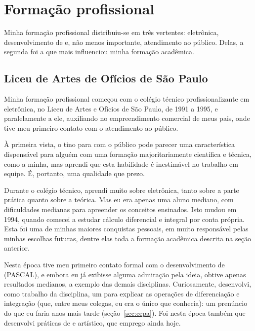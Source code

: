 \section{Formação profissional}
\label{cap:formacao-profissional}

Minha formação profissional distribuiu-se em três vertentes: eletrônica, desenvolvimento de  e, não menos importante, atendimento ao público. Delas, a segunda foi a que mais influenciou minha formação acadêmica.

\subsection{Liceu de Artes de Ofícios de São Paulo}
\label{sec:liceu}

Minha formação profissional começou com o colégio técnico profissionalizante em eletrônica, no Liceu de Artes e Ofícios de São Paulo, de 1991 a 1995, e paralelamente a ele, auxiliando no empreendimento comercial de meus pais, onde tive meu primeiro contato com o atendimento ao público.

À primeira vista, o tino para com o público pode parecer uma característica dispensável para alguém com uma formação majoritariamente científica e técnica, como a minha, mas aprendi que esta habilidade é inestimável no trabalho em equipe. É, portanto, uma qualidade que prezo.

Durante o colégio técnico, aprendi muito sobre eletrônica, tanto sobre a parte prática quanto sobre a teórica. Mas eu era apenas uma aluno mediano, com dificuldades medianas para apreender os conceitos ensinados. Isto mudou em 1994, quando comecei a estudar cálculo diferencial e integral por conta própria. Esta foi uma de minhas maiores conquistas pessoais, em muito responsável pelas minhas escolhas futuras, dentre elas toda a formação acadêmica descrita na seção anterior.

Nesta época tive meu primeiro contato formal com o desenvolvimento de  (PASCAL), e embora eu já exibisse alguma admiração pela ideia, obtive apenas resultados medianos, a exemplo das demais disciplinas. Curiosamente, desenvolvi, como trabalho da disciplina, um  para explicar as operações de diferenciação e integração (que, entre meus colegas, eu era o único que conhecia): um prenúncio do que eu faria anos mais tarde (seção~\ref{sec:cepa}). Foi nesta época também que desenvolvi práticas de  e artístico, que emprego ainda hoje.

